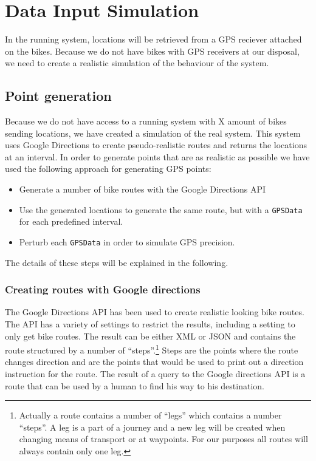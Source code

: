 
\section{Data Input Simulation}\label{design:datasimulation}
In the running system, locations will be retrieved from a GPS reciever attached on the bikes.
Because we do not have bikes with GPS receivers at our disposal, we need to create a realistic simulation of the behaviour of the system.

\subsection{Point generation}
Because we do not have access to a running system with X amount of bikes sending locations, we have created a simulation of the real system.
This system uses Google Directions to create pseudo-realistic routes and returns the locations at an interval.
In order to generate points that are as realistic as possible we have used the following approach for generating GPS points:

\begin{itemize}
\item Generate a number of bike routes with the Google Directions API
\item Use the generated locations to generate the same route, but with a \texttt{GPSData} for each predefined interval.
\item Perturb each \texttt{GPSData} in order to simulate GPS precision.
\end{itemize}

The details of these steps will be explained in the following.

\subsubsection{Creating routes with Google directions}
The Google Directions API \cite{gdirections} has been used to create realistic looking bike routes.
The API has a variety of settings to restrict the results, including a setting to only get bike routes.
The result can be either XML or JSON and contains the route structured by a number of ``steps''.\footnote{Actually a route contains a number of  ``legs'' which contains a number ``steps''. 
A leg is a part of a journey and a new leg will be created when changing means of transport or at waypoints.
For our purposes all routes will always contain only one leg.}
Steps are the points where the route changes direction and are the points that would be used to print out a direction instruction for the route.
The result of a query to the Google directions API is a route that can be used by a human to find his way to his destination.

